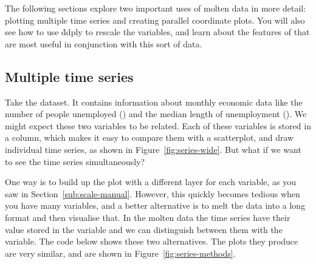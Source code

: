 The following sections explore two important uses of molten data in more detail: plotting multiple time series and creating parallel coordinate plots. You will also see how to use \f{ddply} to rescale the variables, and learn about the features of \ggplot that are most useful in conjunction with this sort of data.

\subsection{Multiple time series}
\label{sub:time-series}

Take the  dataset.  It contains information about monthly economic data like the number of people unemployed () and the median length of unemployment ().  We might expect these two variables to be related.  Each of these variables is stored in a column, which makes it easy to compare them with a scatterplot, and draw individual time series, as shown in Figure~\ref{fig:series-wide}.  But what if we want to see the time series simultaneously?  

% 


One way is to build up the plot with a different layer for each variable, as you saw in Section~\ref{sub:scale-manual}. However, this quickly becomes tedious when you have many variables, and a better alternative is to melt the data into a long format and then visualise that. In the molten data the time series have their value stored in the  variable and we can distinguish between them with the  variable. The code below shows these two alternatives. The plots they produce are very similar, and are shown in Figure~\ref{fig:series-methods}.

% 
%


